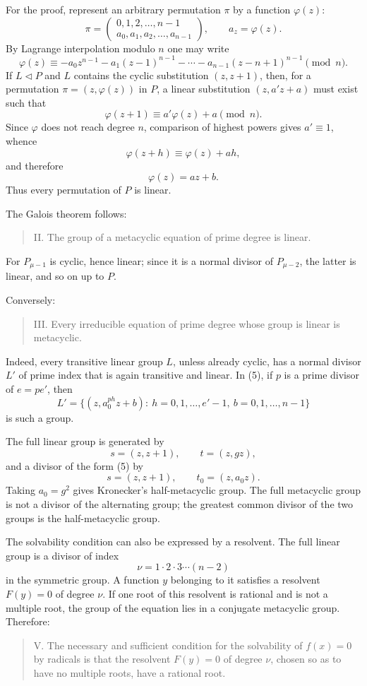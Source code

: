 \documentclass[11pt]{article}
\newcommand{\perm}[2]{\begin{pmatrix}#1\\#2\end{pmatrix}}
\begin{document}
For the proof, represent an arbitrary permutation $\pi$ by a function $\varphi(z)$:
\[
 \pi=\perm{0,1,2,\ldots,n-1}{a_0,a_1,a_2,\ldots,a_{n-1}},
 \qquad a_z=\varphi(z).
\]
By Lagrange interpolation modulo $n$ one may write
\[
  \varphi(z)\equiv -a_0 z^{n-1}-a_1(z-1)^{n-1}-\cdots-a_{n-1}(z-n+1)^{n-1}\pmod n. \tag{6}
\]
If $L\triangleleft P$ and $L$ contains the cyclic substitution $(z,z+1)$, then, for a permutation $\pi=(z,\varphi(z))$ in $P$, a linear substitution $(z,a'z+a)$ must exist such that
\[
  \varphi(z+1)\equiv a'\varphi(z)+a\pmod n.                     \tag{7}
\]
Since $\varphi$ does not reach degree $n$, comparison of highest powers gives $a'\equiv1$, whence
\[
  \varphi(z+h)\equiv \varphi(z)+ah,
\]
and therefore
\[
  \varphi(z)=az+b.                                               \tag{8}
\]
Thus every permutation of $P$ is linear.

The Galois theorem follows:
\begin{quote}
II. The group of a metacyclic equation of prime degree is linear.
\end{quote}
For $P_{\mu-1}$ is cyclic, hence linear; since it is a normal divisor of $P_{\mu-2}$, the latter is linear, and so on up to $P$.

Conversely:
\begin{quote}
III. Every irreducible equation of prime degree whose group is linear is metacyclic.
\end{quote}
Indeed, every transitive linear group $L$, unless already cyclic, has a normal divisor $L'$ of prime index that is again transitive and linear. In (5), if $p$ is a prime divisor of $e=pe'$, then
\[
  L'=\bigl\{(z,a_0^{ph}z+b):\ h=0,1,\ldots,e'-1,
       \ b=0,1,\ldots,n-1\bigr\}
\]
is such a group.

The full linear group is generated by
\[
  s=(z,z+1),\qquad t=(z,gz),                                      \tag{9}
\]
and a divisor of the form (5) by
\[
  s=(z,z+1),\qquad t_0=(z,a_0z).                                \tag{10}
\]
Taking $a_0=g^2$ gives Kronecker's half-metacyclic group. The full metacyclic group is not a divisor of the alternating group; the greatest common divisor of the two groups is the half-metacyclic group.

The solvability condition can also be expressed by a resolvent. The full linear group is a divisor of index
\[
  \nu=1\cdot2\cdot3\cdots(n-2)
\]
in the symmetric group. A function $y$ belonging to it satisfies a resolvent $F(y)=0$ of degree $\nu$. If one root of this resolvent is rational and is not a multiple root, the group of the equation lies in a conjugate metacyclic group. Therefore:
\begin{quote}
V. The necessary and sufficient condition for the solvability of $f(x)=0$ by radicals is that the resolvent $F(y)=0$ of degree $\nu$, chosen so as to have no multiple roots, have a rational root.
\end{quote}
\end{document}
